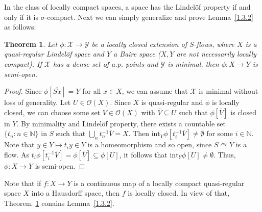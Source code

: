 \documentclass[12pt,final,3p,times]{elsarticle}
\newtheorem{sthm}{Theorem}[subsection]
\theoremstyle{definition}
\numberwithin{equation}{section}
\begin{document}
In the class of locally compact spaces, a space has the Lindel\"{o}f property if and only if it is $\sigma$-compact. 
Next we can simply generalize and prove Lemma~\ref{1.3.2} as follows:

\begin{sthm}\label{P2.2.1}
Let $\phi\colon\mathscr{X}\rightarrow\mathscr{Y}$ be a locally closed extension of $S$-flows, where $X$ is a quasi-regular Lindel\"{o}f space and $Y$ a Baire space ($X,Y$ are not necessarily locally compact).
If $\mathscr{X}$ has a dense set of a.p. points and $\mathscr{Y}$ is minimal, then $\phi\colon X\rightarrow Y$ is semi-open.
\end{sthm}

\begin{proof}
    Since $\phi[\overline{Sx}]=Y$ for all $x\in X$, we can assume that $\mathscr{X}$ is minimal without loss of generality. Let $U\in\mathscr{O}(X)$. Since $X$ is quasi-regular and $\phi$ is locally closed, we can choose some set $V\in\mathscr{O}(X)$ with $\bar{V}\subseteq U$ such that $\phi[\bar{V}]$ is closed in $Y$. By minimality and Lindel\"{o}f property, there exists a countable set $\{t_n\colon n\in\mathbb{N}\}$ in $S$ such that $\bigcup_nt_n^{-1}\bar{V}=X$. Then $\textrm{int}_Y\phi[t_i^{-1}\bar{V}]\not=\emptyset$ for some $i\in\mathbb{N}$. Note that $y\in Y\mapsto t_iy\in Y$ is a homeomorphism and so open, since $S\curvearrowright Y$ is a flow. As $t_i\phi[t_i^{-1}\bar{V}]=\phi[\bar{V}]\subseteq\phi[U]$, it follows that $\textrm{int}_Y\phi[U]\not=\emptyset$. Thus, $\phi\colon X\rightarrow Y$ is semi-open. 
\end{proof}

Note that if $f\colon X\rightarrow Y$ is a continuous map of a locally compact quasi-regular space $X$ into a Hausdorff space,
then $f$ is locally closed. In view of that, Theorem~\ref{P2.2.1} conains Lemma~\ref{1.3.2}.
\end{document}
